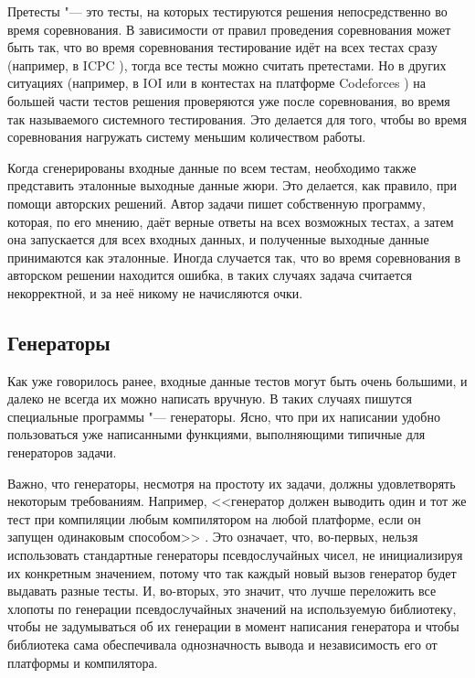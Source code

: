 Претесты "--- это тесты, на которых тестируются решения непосредственно во время соревнования. В зависимости от правил проведения соревнования может быть так, что во время соревнования тестирование идёт на всех тестах сразу (например, в ICPC \cite{wiki}), тогда все тесты можно считать претестами. Но в других ситуациях (например, в IOI \cite{wiki} или в контестах на платформе Codeforces \cite{codeforces}) на большей части тестов решения проверяются уже после соревнования, во время так называемого системного тестирования. Это делается для того, чтобы во время соревнования нагружать систему меньшим количеством работы.

Когда сгенерированы входные данные по всем тестам, необходимо также представить эталонные выходные данные жюри. Это делается, как правило, при помощи авторских решений. Автор задачи пишет собственную программу, которая, по его мнению, даёт верные ответы на всех возможных тестах, а затем она запускается для всех входных данных, и полученные выходные данные принимаются как эталонные. Иногда случается так, что во время соревнования в авторском решении находится ошибка, в таких случаях задача считается некорректной, и за неё никому не начисляются очки.

\subsection{Генераторы}

Как уже говорилось ранее, входные данные тестов могут быть очень большими, и далеко не всегда их можно написать вручную. В таких случаях пишутся специальные программы "--- генераторы. Ясно, что при их написании удобно пользоваться уже написанными функциями, выполняющими типичные для генераторов задачи.

Важно, что генераторы, несмотря на простоту их задачи, должны удовлетворять некоторым требованиям. Например, <<генератор должен выводить один и тот же тест при компиляции любым компилятором на любой платформе, если он запущен одинаковым способом>> \cite{testlib}. Это означает, что, во-первых, нельзя использовать стандартные генераторы псевдослучайных чисел, не инициализируя их конкретным значением, потому что так каждый новый вызов генератор будет выдавать разные тесты. И, во-вторых, это значит, что лучше переложить все хлопоты по генерации псевдослучайных значений на используемую библиотеку, чтобы не задумываться об их генерации в момент написания генератора и чтобы библиотека сама обеспечивала однозначность вывода и независимость его от платформы и компилятора.

